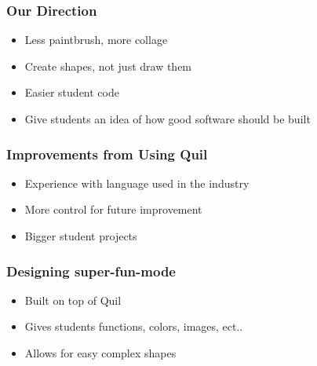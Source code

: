 \documentclass{beamer}
\begin{document}
\begin{frame}
	\frametitle{Our Direction}
	\begin{itemize}
		\item Less paintbrush, more collage
		\item Create shapes, not just draw them
		\item Easier student code
		\item Give students an idea of how good software should be built              
	\end{itemize}
\end{frame}

\begin{frame}
	\frametitle{Improvements from Using Quil}
	\begin{itemize}
		\item Experience with language used in the industry
		\item More control for future improvement
		\item Bigger student projects
	\end{itemize}
\end{frame}

\begin{frame}
	\frametitle{Designing super-fun-mode}
	\begin{itemize}
		\item Built on top of Quil
		\item Gives students functions, colors, images, ect..
		\item Allows for easy complex shapes
	\end{itemize}
\end{frame}
\end{document}
